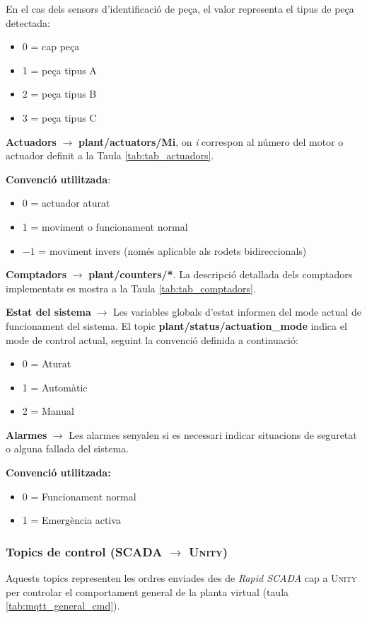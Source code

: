 \documentclass[a4paper,11pt,DIV=13,headings=normal,abstract=true,twoside=semi]{article}
\newcommand{\acro}[1]{\textsc{#1}}
\begin{document}
En el cas dels sensors d'identificació de peça, el valor representa el tipus de peça detectada:

\begin{itemize}
\item 0 = cap peça
\item 1 = peça tipus A
\item 2 = peça tipus B
\item 3 = peça tipus C
\end{itemize}

\textbf{Actuadors} $\rightarrow$ \textbf{plant/actuators/Mi}, on \emph{i} correspon al número del motor o actuador definit a la Taula \ref{tab:tab_actuadors}.

\textbf{Convenció utilitzada}:

\begin{itemize}
\item 0 = actuador aturat
\item 1 = moviment o funcionament normal
\item $-1$ = moviment invers (només aplicable als rodets bidireccionals)
\end{itemize}

\textbf{Comptadors} $\rightarrow$ \textbf{plant/counters/*}. La descripció detallada dels comptadors implementats es mostra a la Taula \ref{tab:tab_comptadors}.

\textbf{Estat del sistema} $\rightarrow$ Les variables globals d'estat informen del mode actual de funcionament del sistema. El topic \textbf{plant/status/actuation\_mode} indica el mode de control actual, seguint la convenció definida a continuació:

\begin{itemize}
\item 0 = Aturat
\item 1 = Automàtic
\item 2 = Manual
\end{itemize}


\textbf{Alarmes} $\rightarrow$ Les alarmes senyalen si es necessari indicar situacions de seguretat o alguna fallada del sistema.

\textbf{Convenció utilitzada:}

\begin{itemize}
\item 0 = Funcionament normal
\item 1 = Emergència activa
\end{itemize}

\subsubsection{Topics de control (\acro{SCADA} $\rightarrow$ \acro{Unity})}
Aquests topics representen les ordres enviades des de \emph{Rapid SCADA} cap a \acro{Unity} per controlar el comportament general de la planta virtual (taula \ref{tab:mqtt_general_cmd}).
\end{document}
